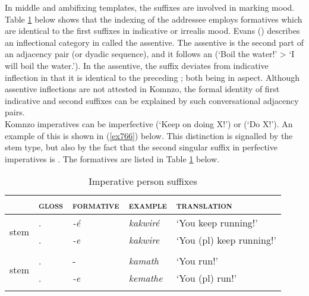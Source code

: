 In middle and ambifixing templates, the  suffixes are involved in marking  mood. Table \ref{perssuffimp} below shows that the indexing of the addressee employs formatives which are identical to the first  suffixes in indicative or irrealis mood. Evans (\citeyear{Evans:2012ue}) describes an inflectional category in  called the assentive. The assentive is the second part of an adjacency pair (or dyadic sequence), and it follows an  (`Boil the water!' > `I will boil the water.'). In the assentive, the  suffix deviates from indicative inflection in that it is identical to the preceding ; both being  in  aspect. Although assentive inflections are not attested in Komnzo, the formal identity of first  indicative and second   suffixes can be explained by such conversational adjacency pairs.\\

Komnzo imperatives can be imperfective (`Keep on doing X!') or  (`Do X!'). An example of this is shown in (\ref{ex766}) below. This distinction is signalled by the stem type, but also by the fact that the second singular suffix in perfective imperatives is . The formatives are listed in Table \ref{perssuffimp} below.

\begin{table}
\caption{Imperative person suffixes}
\label{perssuffimp}
	\begin{tabular}{lllll}
		\lsptoprule
		&\textsc{gloss} &\textsc{formative} &\textsc{example} &\textsc{translation}\\\hline
		\multirow{2}{*}{\Ext{} stem} &\Ssg.\Imp &\emph{-é}	&\emph{kakwiré} &`You keep running!'\\
		&\Snsg.\Imp	&\emph{-e} &\emph{kakwire} &`You (pl) keep running!'\\
		&&&&\\
		\multirow{2}{*}{\Rs{} stem} &\Ssg.\Imp &-\Zero &\emph{kamath} &`You run!'\\
		&\Snsg.\Imp	&\emph{-e} &\emph{kemathe} &`You (pl) run!'\\
		\lspbottomrule
	\end{tabular}
\end{table}%

